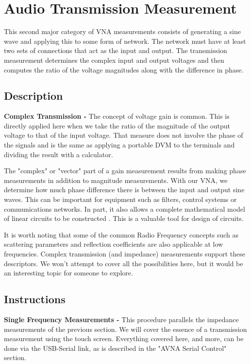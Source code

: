 \section{Audio Transmission Measurement}
\label{sect:Trans}
This second major category of VNA measurements consists of generating a sine wave and applying this to some form of network.
 The network must have at least two sets of connections that act as the input and output.
The transmission measurement determines the complex input and output voltages and then computes the ratio of the voltage magnitudes along with the difference in phase.
%
\subsection{Description}
\label{subsect:TDescr}
\textbf{Complex Transmission - }The concept of voltage gain  is common.
This is directly applied here when we take the ratio of the magnitude of the output voltage to that of the input voltage.
That measure does not involve the phase of the signals and is the same as applying a portable DVM to the terminals and dividing the result with a calculator.

The "complex" or "vector" part of a gain measurement results from making phase measurements in addition to magnitude measurements.
With our VNA, we determine how much phase difference there is between the input and output sine waves.
This can be important for equipment such as  filters, control systems or communications networks.
In part, it also allows a complete mathematical model of linear circuits to be constructed .  This is a valuable tool for design of circuits.

It is worth noting that some of the common Radio Frequency concepts such as scattering parameters and reflection coefficients are also applicable at low frequencies.  Complex transmission (and impedance) measurements support these descriptors.  We won't attempt to cover all the possibilities here, but it would be an interesting topic for someone to explore.

\subsection{Instructions}
\label{subsect:TInstr}
\textbf{Single Frequency Measurements - }This procedure parallels the impedance measurements of the previous section.
We will cover the essence of a transmission measurement using the touch screen.
Everything covered here, and more, can be done via the USB-Serial link, as is described in the "AVNA Serial Control" section.

